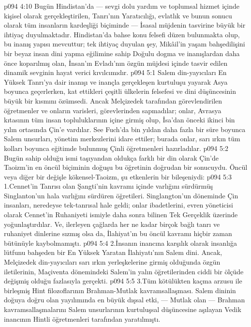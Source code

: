 \vs p094 4:10 Bugün Hindistan’da --- sevgi dolu yardım ve toplumsal hizmet içinde kişisel olarak gerçekleştirilen, Tanrı’nın Yaratıcılığı, evlatlık ve bunun sonucu olarak tüm insanların kardeşliği biçiminde --- İsasal müjdenin tasvirine büyük bir ihtiyaç duyulmaktadır. Hindistan’da bahse konu felsefi düzen bulunmakta olup, bu inanış yapısı mevcuttur; tek ihtiyaç duyulan şey, Mikâil’in yaşam bahşedilişini bir beyaz insan dini yapma eğilimine sahip Doğulu dogma ve inanışlardan daha önce koparılmış olan, İnsan’ın Evladı’nın özgün müjdesi içinde tasvir edilen dinamik sevginin hayat verici kıvılcımıdır.
\vs p094 5:1 Salem din\hyp{}yayıcıları En Yüksek Tanrı’ya dair inanışı ve inançla gerçekleşen kurtuluşu yayarak Asya boyunca geçerlerken, kat ettikleri çeşitli ülkelerin felsefesi ve dini düşüncesinin büyük bir kısmını özümsedi. Ancak Melçizedek tarafından görevlendirilen öğretmenler ve onların varisleri, görevlerinden sapmadılar; onlar, Avrasya kıtasının tüm insan topluluklarının içine girmiş olup, İsa’dan önceki ikinci bin yılın ortasında Çin’e vardılar. See Fuch’da bin yıldan daha fazla bir süre boyunca Salem unsurları, yönetim merkezlerini idare ettiler; burada onlar, sarı ırkın tüm kolları boyunca eğitimde bulunmuş Çinli öğretmenleri hazırladılar.
\vs p094 5:2 Bugün sahip olduğu ismi taşıyandan oldukça farklı bir din olarak Çin’de Taoizm’in en öncül biçiminin doğuşu bu öğretinin doğrudan bir sonucuydu. Öncül veya diğer bir değişle kökensel\hyp{}Taoizm, şu etkenlerin bir bileşeniydi:
\vs p094 5:3 1.\bibnobreakspace Cennet’in Tanrısı olan Şangti’nin kavramı içinde varlığını sürdürmüş Singlanton’un hala varlığını sürdüren öğretileri. Singlangton’un döneminde Çin insanları, neredeyse tek\hyp{}tanrısal hale geldi; onlar ibadetlerini, evren yöneticisi olarak Cennet’in Ruhaniyeti ismiyle daha sonra bilinen Tek Gerçeklik üzerinde yoğunlaştırdılar. Ve, ilerleyen çağlarda her ne kadar birçok bağlı tanrı ve ruhaniyet dinlerine sızmış olsa da, İlahiyat’ın bu öncül kavramı hiçbir zaman bütünüyle kaybolmamıştı.
\vs p094 5:4 2.\bibnobreakspace İnsanın inancına karşılık olarak insanlığa lütfunu bahşeden bir En Yüksek Yaratan İlahiyatı’nın Salem dini. Ancak, Melçizedek din\hyp{}yayıcıları sarı ırkın yerleşkelerine girmiş olduğunda özgün iletilerinin, Maçiventa dönemindeki Salem’in yalın öğretilerinden ciddi bir ölçüde değişmiş olduğu fazlasıyla gerçekti.
\vs p094 5:5 3.\bibnobreakspace Tüm kötülükten kaçma arzusu ile birleşmiş Hint filozoflarının Brahman\hyp{}Mutlak kavramsallaşması. Salem dininin doğuya doğru olan yayılımında en büyük dışsal etki, --- Mutlak olan --- Brahman kavramsallaşmalarını Salem unsurlarının kurtuluşsal düşüncesine aşılayan Vedik inancının Hintli öğretmenleri tarafından yaratılmıştı.

